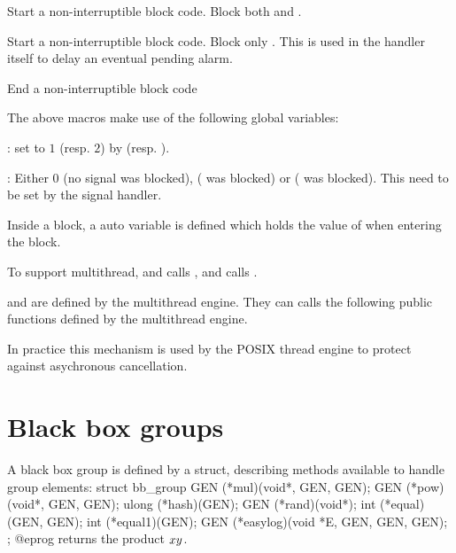   Start a non-interruptible block code. Block both  and .

  Start a non-interruptible block code. Block only .
This is used in the  handler itself to delay an eventual pending
alarm.

  End a non-interruptible block code

The above macros make use of the following global variables:

: set to $1$ (resp. $2$) by 
(resp. ).

: Either $0$ (no signal was blocked), 
( was blocked) or  ( was blocked).
This need to be set by the signal handler.

Inside a block, a auto variable  is defined which holds the
value of  when entering the block.


To support multithread,  and
 calls , and
 calls .

 and  are defined by the
multithread engine. They can calls the following public functions defined by
the multithread engine.



In practice this mechanism is used by the POSIX thread engine to protect against
asychronous cancellation.

\section{Black box groups}

A black box group is defined by a  struct, describing methods
available to handle group elements:
\bprog
    struct bb_group
    {
      GEN (*mul)(void*, GEN, GEN);
      GEN (*pow)(void*, GEN, GEN);
      ulong (*hash)(GEN);
      GEN (*rand)(void*);
      int (*equal)(GEN, GEN);
      int (*equal1)(GEN);
      GEN (*easylog)(void *E, GEN, GEN, GEN);
    };
@eprog
 returns the product $x\*y$.

